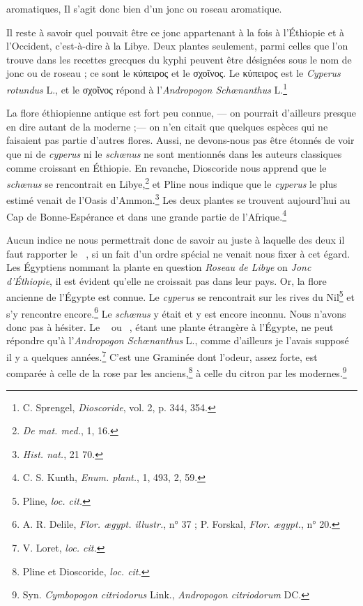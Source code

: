\documentclass[a4paper, 11pt, oneside]{article}
\newcommand*\hieroAACM{}
\newcommand*\hieroAAFN{}
\newcommand*\hieroAAFO{\raisebox{0.5ex}{}}
\newcommand*\hieroAAHQ{}
\newcommand*\hieroAAHR{}
\newcommand*\hieroAAUY{}
\begin{document}
aromatiques, Il s'agit donc bien d'un jonc ou roseau aromatique.

Il reste à savoir quel pouvait être ce jonc appartenant à la fois à l'Éthiopie et à l'Occident, c'est-à-dire à la Libye. Deux plantes seulement, parmi celles que l'on trouve dans les recettes grecques du kyphi peuvent être désignées sous le nom de jonc ou de roseau ; ce sont le κύπειρος et le σχοῖνος. Le κύπειρος est le \emph{Cyperus rotundus} L., et le σχοῖνος répond à l'\emph{Andropogon Schœnanthus} L.\footnote{C. Sprengel, \emph{Dioscoride}, vol. 2, p. 344, 354.}

La flore éthiopienne antique est fort peu connue, --- on pourrait d'ailleurs presque en dire autant de la moderne ;--- on n'en citait que quelques espèces qui ne faisaient pas partie d'autres flores. Aussi, ne devons-nous pas être étonnés de voir que ni de \emph{cyperus} ni le \emph{schœnus} ne sont mentionnés dans les auteurs classiques comme croissant en Éthiopie. En revanche, Dioscoride nous apprend que le \emph{schœnus} se rencontrait en Libye,\footnote{\emph{De mat. med.}, 1, 16.} et Pline nous indique que le \emph{cyperus} le plus estimé venait de l'Oasis d'Ammon.\footnote{\emph{Hist. nat.}, 21 70.} Les deux plantes se trouvent aujourd'hui au Cap de Bonne-Espérance et dans une grande partie de l'Afrique.\footnote{C. S. Kunth, \emph{Enum. plant.}, 1, 493, 2, 59.}

Aucun indice ne nous permettrait donc de savoir au juste à laquelle des deux il faut rapporter le $\hieroAACM\:\hieroAAFN\:\hieroAAFO$, si un fait d'un ordre spécial ne venait nous fixer à cet égard. Les Égyptiens nommant la plante en question \emph{Roseau de Libye} on \emph{Jonc d'Éthiopie}, il est évident qu'elle ne croissait pas dans leur pays. Or, la flore ancienne de l'Égypte est connue. Le \emph{cyperus} se rencontrait sur les rives du Nil\footnote{Pline, \emph{loc. cit.}} et s'y rencontre encore.\footnote{A. R. Delile, \emph{Flor. ægypt. illustr.}, n° 37 ; P. Forskal, \emph{Flor. ægypt.}, n° 20.} Le \emph{schœnus} y était et y est encore inconnu. Nous n'avons donc pas à hésiter. Le $\hieroAACM\:\hieroAAFN\:\hieroAAFO$ ou $\hieroAAHQ\:\hieroAAHR\:\hieroAAUY$, étant une plante étrangère à l'Égypte, ne peut répondre qu'à l'\emph{Andropogon Schœnanthus} L., comme d'ailleurs je l'avais supposé il y a quelques années.\footnote{V. Loret, \emph{loc. cit.}} C'est une Graminée dont l'odeur, assez forte, est comparée à celle de la rose par les anciens,\footnote{Pline et Dioscoride, \emph{loc. cit.}} à celle du citron par les modernes.\footnote{Syn. \emph{Cymbopogon citriodorus} Link., \emph{Andropogon citriodorum} DC.}
\end{document}
